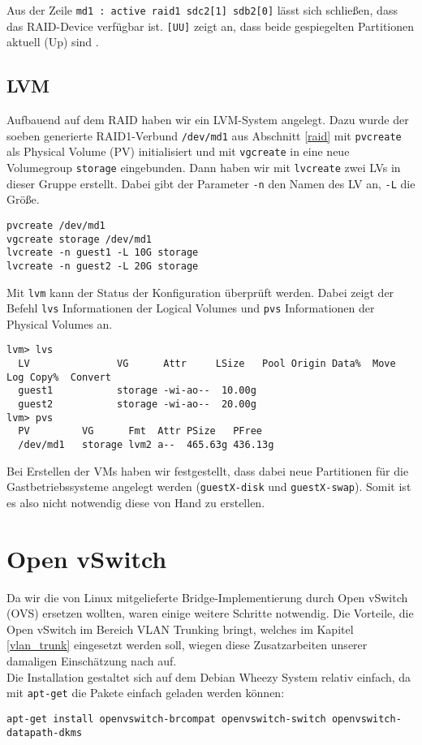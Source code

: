 Aus der Zeile \verb#md1 : active raid1 sdc2[1] sdb2[0]# lässt sich schließen, dass das RAID-Device verfügbar ist. \verb#[UU]# zeigt an, dass beide gespiegelten Partitionen aktuell (Up) sind \cite{wiki_mdstat}.

\section{LVM}
\label{lvm}
Aufbauend auf dem RAID haben wir ein LVM-System angelegt. Dazu wurde der soeben generierte RAID1-Verbund \verb#/dev/md1# aus Abschnitt \ref{raid} mit \verb#pvcreate# als Physical Volume (PV) initialisiert und mit \verb#vgcreate# in eine neue Volumegroup \verb#storage# eingebunden. 
Dann haben wir mit \verb#lvcreate# zwei LVs in dieser Gruppe erstellt. Dabei gibt der Parameter \verb#-n# den Namen des LV an, \verb#-L# die Größe. 
\begin{verbatim}
pvcreate /dev/md1 
vgcreate storage /dev/md1
lvcreate -n guest1 -L 10G storage
lvcreate -n guest2 -L 20G storage
\end{verbatim} 
Mit \verb#lvm# kann der Status der Konfiguration überprüft werden. Dabei zeigt der Befehl \verb#lvs# Informationen der Logical Volumes und \verb#pvs# Informationen der Physical Volumes an. 
\setupVerbatimOut
{}
\begin{verbatim}
lvm> lvs
  LV               VG      Attr     LSize   Pool Origin Data%  Move Log Copy%  Convert                                        
  guest1           storage -wi-ao--  10.00g                                           
  guest2           storage -wi-ao--  20.00g                                           
lvm> pvs
  PV         VG      Fmt  Attr PSize   PFree  
  /dev/md1   storage lvm2 a--  465.63g 436.13g
\end{verbatim} 
Bei Erstellen der VMs haben wir festgestellt, dass dabei neue Partitionen für die Gastbetriebssysteme angelegt werden (\verb#guestX-disk# und \verb#guestX-swap#). Somit ist es also nicht notwendig diese von Hand zu erstellen. 

\chapter{Open vSwitch}
\label{chap:ovs}
Da wir die von Linux mitgelieferte Bridge-Implementierung durch Open vSwitch (OVS) ersetzen wollten, waren einige weitere Schritte notwendig. Die Vorteile, die Open vSwitch im Bereich VLAN Trunking bringt, welches im Kapitel \ref{vlan_trunk} eingesetzt werden soll, wiegen diese Zusatzarbeiten unserer damaligen Einschätzung nach auf. 
\\
Die Installation gestaltet sich auf dem Debian Wheezy System relativ einfach, da mit \verb#apt-get# die Pakete einfach geladen werden können:
\begin{verbatim}
apt-get install openvswitch-brcompat openvswitch-switch openvswitch-datapath-dkms
\end{verbatim}

